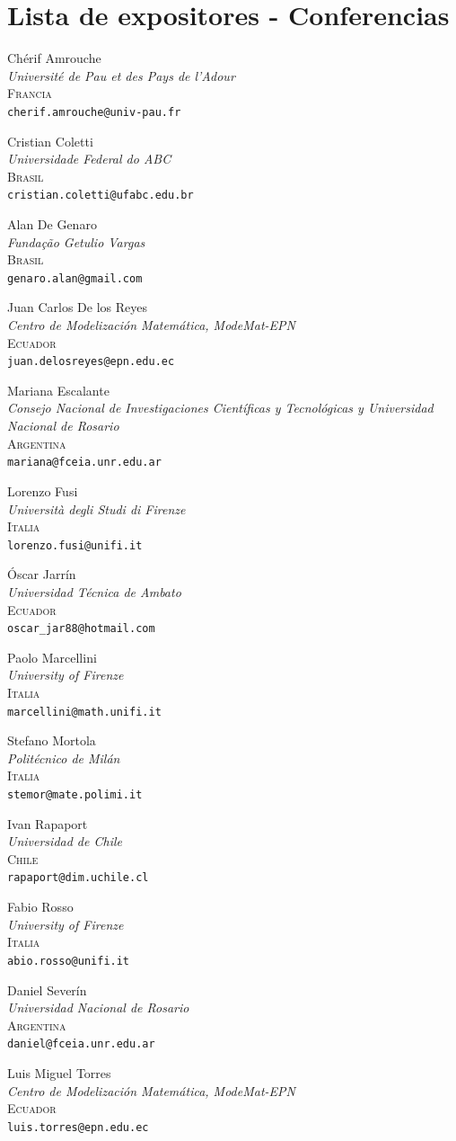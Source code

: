 \documentclass[a5paper,doc,10pt,noapacite]{apa6}
\newcommand{\Modematb}{Centro de Modelización Matemática, ModeMat-EPN}
\newcommand{\vsb}{\vspace{0.75\baselineskip}}
\newcommand{\Speaker}[4]{\vsb #1 \\ \emph{#2} \\ \textsc{#3}\\ \texttt{#4}}
\begin{document}
{%
\newpage
\section{Lista de expositores - Conferencias}
\footnotesize

\begin{spacing}{1.2}
\begin{multicols*}{2}

	\Speaker{Chérif Amrouche}{Université de Pau et des Pays de l’Adour}{Francia}{cherif.amrouche@univ-pau.fr}
	
	
	\Speaker{Cristian Coletti}{Universidade Federal do ABC}{Brasil}{cristian.coletti@ufabc.edu.br}
	
	\Speaker{Alan De Genaro}{Fundaç\~{a}o Getulio Vargas}{Brasil}{genaro.alan@gmail.com}
	
	\Speaker{Juan Carlos De los Reyes}{\Modematb}{Ecuador}{juan.delosreyes@epn.edu.ec}
	
	\Speaker{Mariana Escalante}{Consejo Nacional de Investigaciones Científicas y Tecnológicas y Universidad Nacional de Rosario}{Argentina}{mariana@fceia.unr.edu.ar}
	
	\Speaker{Lorenzo Fusi}{Università degli Studi di Firenze}{Italia}{lorenzo.fusi@unifi.it}
	
	\Speaker{Óscar Jarrín}{Universidad Técnica de Ambato}{Ecuador}{oscar\_jar88@hotmail.com}
	
	
	\Speaker{Paolo Marcellini}{University of Firenze}{Italia}{marcellini@math.unifi.it}
	
	\Speaker{Stefano Mortola}{Politécnico de Milán}{Italia}{stemor@mate.polimi.it}
	
	\Speaker{Ivan Rapaport}{Universidad de Chile}{Chile}{rapaport@dim.uchile.cl}
	
	\Speaker{Fabio Rosso}{University of Firenze}{Italia}{abio.rosso@unifi.it}
	
	\Speaker{Daniel Severín}{Universidad Nacional de Rosario}{Argentina}{daniel@fceia.unr.edu.ar}
	
	\Speaker{Luis Miguel Torres}{\Modematb}{Ecuador}{luis.torres@epn.edu.ec}
	

\end{multicols*}
\end{spacing}}
\end{document}
